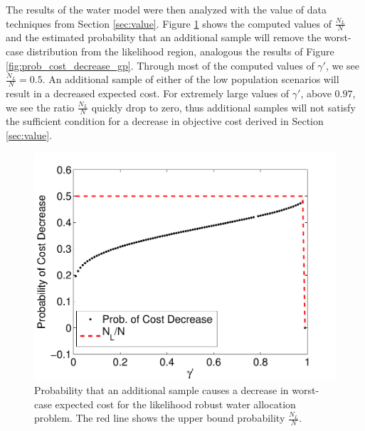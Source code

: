 \documentclass[11pt]{article}
\begin{document}
The results of the water model were then analyzed with the value of data techniques from Section \ref{sec:value}.  Figure \ref{fig:water_prob_decrease} shows the computed values of $\frac{N_L}{N}$ and the estimated probability that an additional sample will remove the worst-case distribution from the likelihood region, analogous the results of Figure \ref{fig:prob_cost_decrease_gp}.  Through most of the computed values of $\gamma'$, we see $\frac{N_L}{N} = 0.5$.  An additional sample of either of the low population scenarios will result in a decreased expected cost.  For extremely large values of $\gamma'$, above $0.97$, we see the ratio $\frac{N_L}{N}$ quickly drop to zero, thus additional samples will not satisfy the sufficient condition for a decrease in objective cost derived in Section \ref{sec:value}.

\begin{figure}
	\centering
	\includegraphics[width=.5\textwidth]{images/water_prob_decrease}
	\caption{Probability that an additional sample causes a decrease in worst-case expected cost for the likelihood robust water allocation problem.  The red line shows the upper bound probability $\tfrac{N_L}{N}$.}
	\label{fig:water_prob_decrease}
\end{figure}



\end{document}

